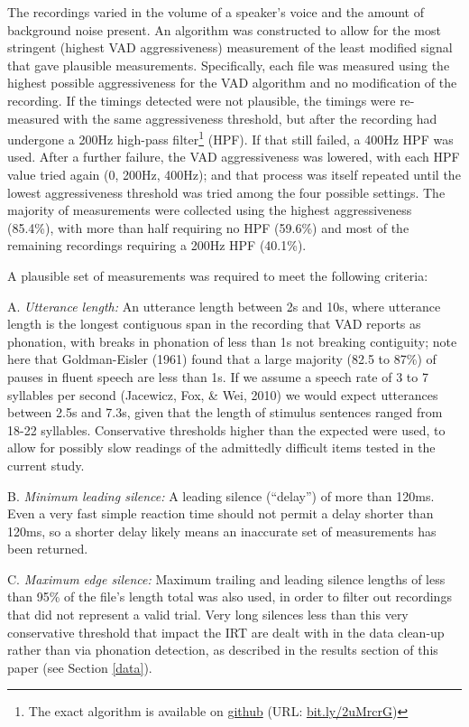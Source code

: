 \documentclass[11pt,oneside]{book}
\let\rmarkdownfootnote\footnote%
\def\footnote{\protect\rmarkdownfootnote}
\begin{document}
The recordings varied in the volume of a speaker's voice and the amount of background noise present. An algorithm was constructed to allow for the most stringent (highest VAD aggressiveness) measurement of the least modified signal that gave plausible measurements. Specifically, each file was measured using the highest possible aggressiveness for the VAD algorithm and no modification of the recording. If the timings detected were not plausible, the timings were re-measured with the same aggressiveness threshold, but after the recording had undergone a 200Hz high-pass filter\footnote{The exact algorithm is available on \href{https://gist.github.com/moui72/4ebc4eb8f69eb9fdb1cab160ce299675}{github} (URL: \href{https://bit.ly/2uMrcrG}{bit.ly/2uMrcrG})} (HPF). If that still failed, a 400Hz HPF was used. After a further failure, the VAD aggressiveness was lowered, with each HPF value tried again (0, 200Hz, 400Hz); and that process was itself repeated until the lowest aggressiveness threshold was tried among the four possible settings. The majority of measurements were collected using the highest aggressiveness (85.4\%), with more than half requiring no HPF (59.6\%) and most of the remaining recordings requiring a 200Hz HPF (40.1\%).

A plausible set of measurements was required to meet the following criteria:

A. \emph{Utterance length:} An utterance length between 2s and 10s, where utterance length is the longest contiguous span in the recording that VAD reports as phonation, with breaks in phonation of less than 1s not breaking contiguity; note here that Goldman-Eisler (1961) found that a large majority (82.5 to 87\%) of pauses in fluent speech are less than 1s. If we assume a speech rate of 3 to 7 syllables per second (Jacewicz, Fox, \& Wei, 2010) we would expect utterances between 2.5s and 7.3s, given that the length of stimulus sentences ranged from 18-22 syllables. Conservative thresholds higher than the expected were used, to allow for possibly slow readings of the admittedly difficult items tested in the current study.

B. \emph{Minimum leading silence:} A leading silence (``delay'') of more than 120ms. Even a very fast simple reaction time should not permit a delay shorter than 120ms, so a shorter delay likely means an inaccurate set of measurements has been returned.

C. \emph{Maximum edge silence:} Maximum trailing and leading silence lengths of less than 95\% of the file's length total was also used, in order to filter out recordings that did not represent a valid trial. Very long silences less than this very conservative threshold that impact the IRT are dealt with in the data clean-up rather than via phonation detection, as described in the results section of this paper (see Section \ref{data}).
\end{document}
